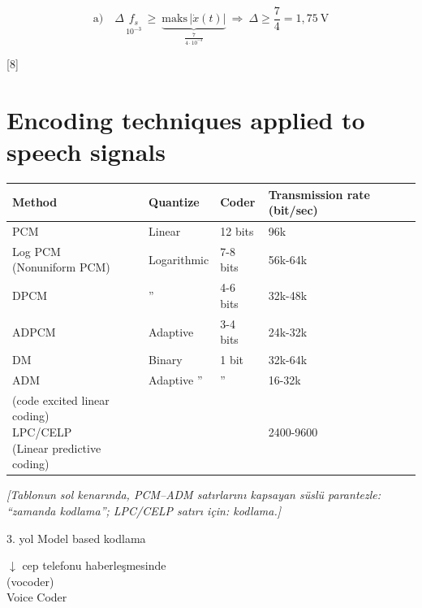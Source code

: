 \documentclass[11pt,a4paper]{article}
\begin{document}
\[ \text{a)}\quad \Delta\,\underset{10^{-3}}{f_s}\ \ge\ \underbrace{\mathrm{maks}\,|\dot{x}(t)|}_{\frac{7}{4\cdot10^{-3}}}\ \Rightarrow\ \Delta\ge\frac{7}{4}=1{,}75\ \mathrm{V} \]

[8]

\section{Encoding techniques applied to speech signals}

\begin{center}
\begin{tabular}{@{}llll@{}}
\toprule
\textbf{Method} & \textbf{Quantize} & \textbf{Coder} & \textbf{Transmission rate} (bit/sec) \\
\midrule
PCM & Linear & 12 bits & 96k \\
\shortstack[l]{Log PCM\\(Nonuniform PCM)} & Logarithmic \okunamadi{} & 7-8 bits & 56k-64k \\
DPCM & '' & 4-6 bits & 32k-48k \\
ADPCM & Adaptive & 3-4 bits & 24k-32k \\
DM & Binary & 1 bit & 32k-64k \\
ADM & Adaptive '' & '' & 16-32k \\
\midrule
\shortstack[l]{{\footnotesize (code excited linear coding)}\\LPC/CELP\\{\footnotesize (Linear predictive coding)}} & & & 2400-9600 \\
\bottomrule
\end{tabular}
\end{center}

\begin{center}\small
\textit{[Tablonun sol kenarında, PCM--ADM satırlarını kapsayan süslü parantezle: ``zamanda kodlama''; LPC/CELP satırı için:  kodlama.]}
\end{center}

3. yol Model based kodlama

\begin{flushleft}
$\downarrow$ cep telefonu haberleşmesinde \\
\hspace*{1.2em}(vocoder) \\
\hspace*{1.2em}Voice Coder
\end{flushleft}
\end{document}
